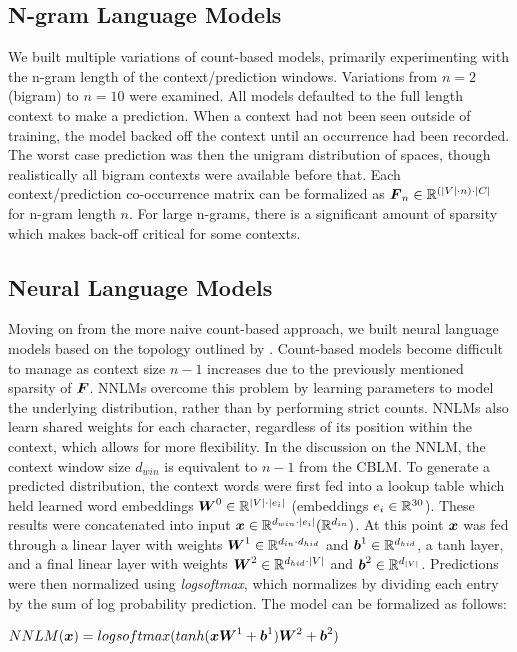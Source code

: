 \documentclass[11pt]{article}
\begin{document}
\subsection{N-gram Language Models}

We built multiple variations of count-based models, primarily experimenting with the n-gram length of the context/prediction windows. Variations from $n=2$ (bigram) to $n=10$ were examined. All models defaulted to the full length context to make a prediction. When a context had not been seen outside of training, the model backed off the context until an occurrence had been recorded. The worst case prediction was then the unigram distribution of spaces, though realistically all bigram contexts were available before that. Each context/prediction co-occurrence matrix can be formalized as $\boldsymbol{F}_{n} \in \mathbb{R}^{(|V| \cdot n) \cdot |C|}$ for n-gram length $n$. For large n-grams, there is a significant amount of sparsity which makes back-off critical for some contexts.

\subsection{Neural Language Models}

Moving on from the more naive count-based approach, we built neural language models based on the topology outlined by \citet{DBLP:journals/jmlr/BengioDVJ03}. Count-based models become difficult to manage as context size $n-1$ increases due to the previously mentioned sparsity of $\boldsymbol{F}$. NNLMs overcome this problem by learning parameters to model the underlying distribution, rather than by performing strict counts. NNLMs also learn shared weights for each character, regardless of its position within the context, which allows for more flexibility. In the discussion on the NNLM, the context window size $d_{win}$ is equivalent to $n-1$ from the CBLM. To generate a predicted distribution, the context words were first fed into a lookup table which held learned word embeddings $\boldsymbol{W}^{0} \in \mathbb{R}^{|V| \cdot |e_{i}|}$ (embeddings $e_{i} \in \mathbb{R}^{30}$). These results were concatenated into input $\boldsymbol{x} \in \mathbb{R}^{d_{win} \cdot |e_{i}|} (\mathbb{R}^{d_{in}})$. At this point $\boldsymbol{x}$ was fed through a linear layer with weights $\boldsymbol{W}^{1} \in \mathbb{R}^{d_{in} \cdot d_{hid}}$ and $\boldsymbol{b}^{1} \in \mathbb{R}^{d_{hid}}$, a tanh layer, and a final linear layer with weights $\boldsymbol{W}^{2} \in \mathbb{R}^{d_{hid} \cdot |V|}$ and $\boldsymbol{b}^{2} \in \mathbb{R}^{d_{|V|}}$. Predictions were then normalized using \textit{logsoftmax}, which normalizes by dividing each entry by the sum  of log probability prediction. The model can be formalized as follows:
\begin{center}
    $NNLM(\boldsymbol{x}) = logsoftmax(tanh(\boldsymbol{x}\boldsymbol{W}^{1} + \boldsymbol{b}^{1})\boldsymbol{W}^{2} + \boldsymbol{b}^{2})$
\end{center}
\end{document}
